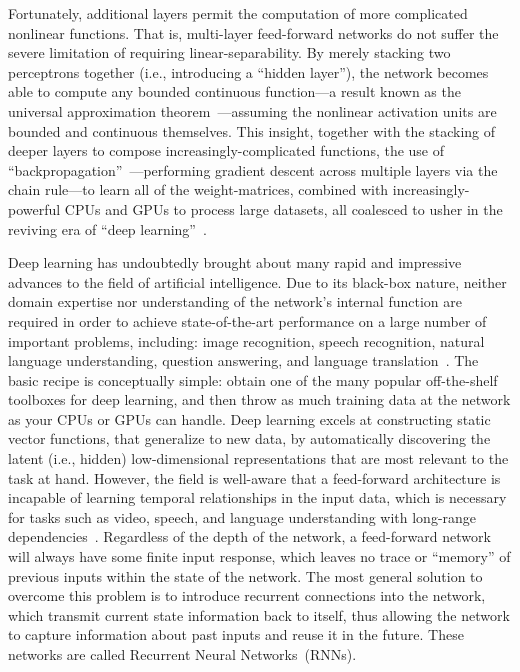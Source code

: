 Fortunately, additional layers permit the computation of more complicated nonlinear functions.
That is, multi-layer feed-forward networks do not suffer the severe limitation of requiring linear-separability.
By merely stacking two perceptrons together (i.e., introducing a ``hidden layer''), the network becomes able to compute any bounded continuous function---a result known as the universal approximation theorem~\citep{hornik1989multilayer}---assuming the nonlinear activation units are bounded and continuous themselves.
This insight, together with the stacking of deeper layers to compose increasingly-complicated functions, the use of ``backpropagation''~\citep{werbos1974beyond, rumelhart1986learning}---performing gradient descent across multiple layers via the chain rule---to learn all of the weight-matrices, combined with increasingly-powerful CPUs and GPUs to process large datasets, all coalesced to usher in the reviving era of ``deep learning''~\citep{sejnowski2018deep}.

Deep learning has undoubtedly brought about many rapid and impressive advances to the field of artificial intelligence.
Due to its black-box nature, neither domain expertise nor understanding of the network's internal function are required in order to achieve state-of-the-art performance on a large number of important problems, including: image recognition, speech recognition, natural language understanding, question answering, and language translation~\citep{lecun2015deep}.
The basic recipe is conceptually simple: obtain one of the many popular off-the-shelf toolboxes for deep learning, and then throw as much training data at the network as your CPUs or GPUs can handle.
Deep learning excels at constructing static vector functions, that generalize to new data, by automatically discovering the latent (i.e., hidden) low-dimensional representations that are most relevant to the task at hand.
However, the field is well-aware that a feed-forward architecture is incapable of learning temporal relationships in the input data, which is necessary for tasks such as video, speech, and language understanding with long-range dependencies~\citep{bengio1994learning}.
Regardless of the depth of the network, a feed-forward network will always have some finite input response, which leaves no trace or ``memory'' of previous inputs within the state of the network.
The most general solution to overcome this problem is to introduce recurrent connections into the network, which transmit current state information back to itself, thus allowing the network to capture information about past inputs and reuse it in the future. 
These networks are called Recurrent Neural Networks~(RNNs).

